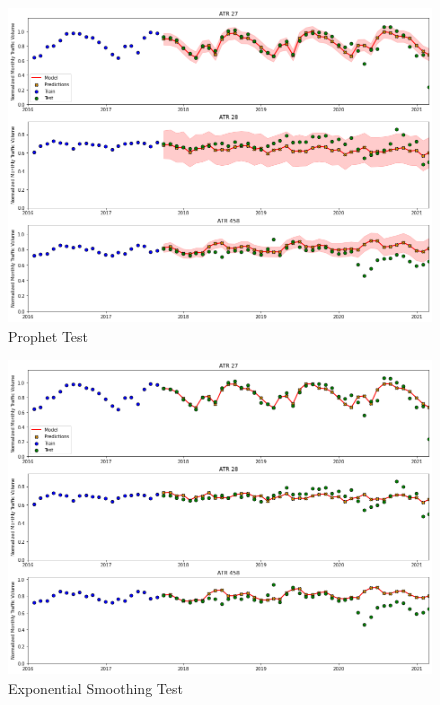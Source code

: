 \documentclass[9pt,twocolumn,twoside, lineno]{jost-new}
\numberwithin{subsection}{section}
\begin{document}
\begin{figure}
\centering
    \includegraphics[width=14.4cm]{figures/model_prophet_zoomed.png}
\caption{Prophet Test}
\label{fig:model_prophet_zoomed}
\end{figure}

\begin{figure}
\centering
    \includegraphics[width=14.4cm]{figures/model_holt_winters_model_zoomed.png}
\caption{Exponential Smoothing Test}
\label{fig:model_holt_winters_model_zoomed}
\end{figure}
\end{document}
